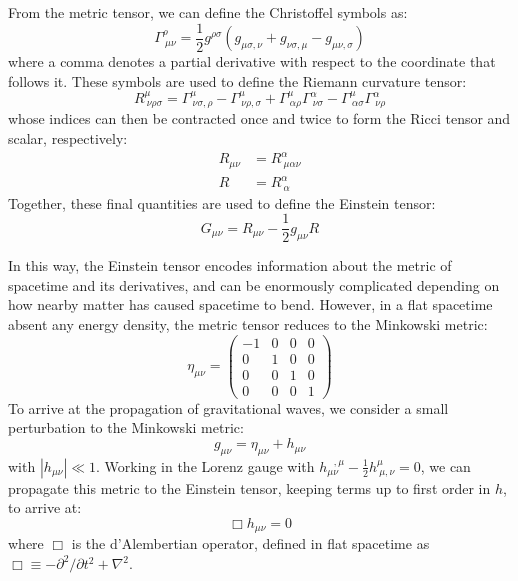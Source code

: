 From the metric tensor, we can define the Christoffel symbols as:
\begin{equation}
    \Gamma^\rho_{\ \mu\nu} = \frac{1}{2} g^{\rho\sigma} (g_{\mu\sigma,\nu} + g_{\nu\sigma,\mu} - g_{\mu\nu,\sigma})
\end{equation}
where a comma denotes a partial derivative with respect to the coordinate that follows it.
These symbols are used to define the Riemann curvature tensor:
\begin{equation}
    R^\mu_{\ \nu\rho\sigma} = \Gamma^\mu_{\ \nu\sigma,\rho} - \Gamma^\mu_{\ \nu\rho,\sigma} + \Gamma^\mu_{\ \alpha\rho}\Gamma^\alpha_{\ \nu\sigma} - \Gamma^\mu_{\ \alpha\sigma}\Gamma^\alpha_{\ \nu\rho}
\end{equation}
whose indices can then be contracted once and twice to form the Ricci tensor and scalar, respectively:
\begin{align}
    R_{\mu\nu} & = R^\alpha_{\ \mu\alpha\nu} \\
    R & = R^{\alpha}_{\ \alpha}
\end{align}
Together, these final quantities are used to define the Einstein tensor:
\begin{equation}
    G_{\mu\nu} = R_{\mu\nu} - \frac{1}{2}g_{\mu\nu} R
\end{equation}

In this way, the Einstein tensor encodes information about the metric of spacetime and its derivatives, and can be enormously complicated depending on how nearby matter has caused spacetime to bend.
However, in a flat spacetime absent any energy density, the metric tensor reduces to the Minkowski metric:
\begin{equation}
   \eta_{\mu\nu} =
   \begin{pmatrix}
        -1 & 0 & 0 & 0 \\
        0 & 1 & 0 & 0 \\
        0 & 0 & 1 & 0 \\
        0 & 0 & 0 & 1
    \end{pmatrix}
\end{equation}
To arrive at the propagation of gravitational waves, we consider a small perturbation to the Minkowski metric:
\begin{equation}
    g_{\mu\nu} = \eta_{\mu\nu} + h_{\mu\nu}
\end{equation}
with $| h_{\mu\nu} | \ll 1$.
Working in the Lorenz gauge with $h_{\mu\nu}^{\ \ \ ,\mu} - \frac{1}{2} h^\mu_{\ \mu,\nu} = 0$, we can propagate this metric to the Einstein tensor, keeping terms up to first order in $h$, to arrive at:
\begin{equation}
    \Box h_{\mu\nu} = 0
\end{equation}
where $\Box$ is the d'Alembertian operator, defined in flat spacetime as $\Box \equiv -\partial^2 / \partial t^2 + \nabla^2$.

